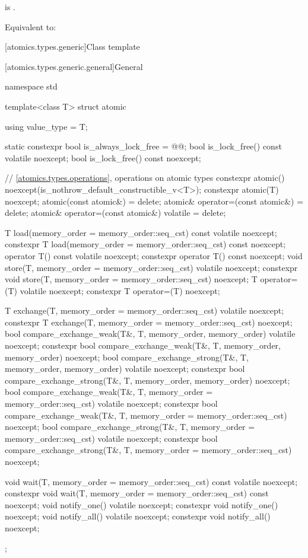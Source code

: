 \begin{itemdescr}
\pnum
\constraints
{} is .

\pnum
\effects
Equivalent to: 
\end{itemdescr}

[atomics.types.generic]{Class template }

[atomics.types.generic.general]{General}

%
%
\begin{codeblock}
namespace std {
  template<class T> struct atomic {
    using value_type = T;

    static constexpr bool is_always_lock_free = @@;
    bool is_lock_free() const volatile noexcept;
    bool is_lock_free() const noexcept;

    // \ref{atomics.types.operations}, operations on atomic types
    constexpr atomic() noexcept(is_nothrow_default_constructible_v<T>);
    constexpr atomic(T) noexcept;
    atomic(const atomic&) = delete;
    atomic& operator=(const atomic&) = delete;
    atomic& operator=(const atomic&) volatile = delete;

    T load(memory_order = memory_order::seq_cst) const volatile noexcept;
    constexpr T load(memory_order = memory_order::seq_cst) const noexcept;
    operator T() const volatile noexcept;
    constexpr operator T() const noexcept;
    void store(T, memory_order = memory_order::seq_cst) volatile noexcept;
    constexpr void store(T, memory_order = memory_order::seq_cst) noexcept;
    T operator=(T) volatile noexcept;
    constexpr T operator=(T) noexcept;

    T exchange(T, memory_order = memory_order::seq_cst) volatile noexcept;
    constexpr T exchange(T, memory_order = memory_order::seq_cst) noexcept;
    bool compare_exchange_weak(T&, T, memory_order, memory_order) volatile noexcept;
    constexpr bool compare_exchange_weak(T&, T, memory_order, memory_order) noexcept;
    bool compare_exchange_strong(T&, T, memory_order, memory_order) volatile noexcept;
    constexpr bool compare_exchange_strong(T&, T, memory_order, memory_order) noexcept;
    bool compare_exchange_weak(T&, T, memory_order = memory_order::seq_cst) volatile noexcept;
    constexpr bool compare_exchange_weak(T&, T, memory_order = memory_order::seq_cst) noexcept;
    bool compare_exchange_strong(T&, T, memory_order = memory_order::seq_cst) volatile noexcept;
    constexpr bool compare_exchange_strong(T&, T, memory_order = memory_order::seq_cst) noexcept;

    void wait(T, memory_order = memory_order::seq_cst) const volatile noexcept;
    constexpr void wait(T, memory_order = memory_order::seq_cst) const noexcept;
    void notify_one() volatile noexcept;
    constexpr void notify_one() noexcept;
    void notify_all() volatile noexcept;
    constexpr void notify_all() noexcept;
  };
}
\end{codeblock}

